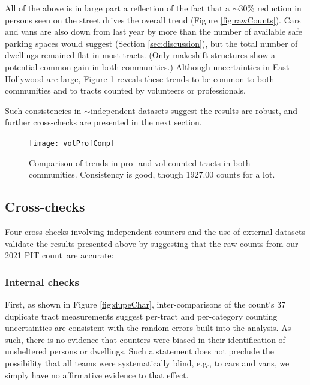\documentclass[11pt,twocolumn]{article}
\def\Count{count}
\begin{document}
All of the above is in large part a reflection of the fact that a $\sim$30\% reduction in persons seen 
on the street drives the overall trend (Figure \ref{fig:rawCounts}). Cars and vans are also down from 
last year by more than the number of available safe parking spaces would suggest 
(Section \ref{sec:discussion}), but the total number of dwellings remained flat in most tracts. 
(Only makeshift structures show a potential common gain in both communities.)
Although uncertainties in East Hollywood are large, Figure \ref{fig:proVolComp} reveals these 
trends to be common to both communities and to tracts counted by volunteers or professionals.

Such consistencies in $\sim$independent datasets suggest the results are robust, and further 
cross-checks are presented in the next section.


\begin{figure}[]
	\centering
	\texttt{[image: volProfComp]}
	\caption{Comparison of trends in pro- and vol-counted tracts in both communities.
			Consistency is good, though 1927.00 counts for a lot.}
	\label{fig:proVolComp}
\end{figure}

\subsection{Cross-checks}
\label{sec:crossChecks}

Four cross-checks involving independent counters and the use of external datasets validate the
results presented above by suggesting that the raw counts from our 2021 PIT \Count\ are accurate:

\subsubsection{Internal checks}

First, as shown in Figure \ref{fig:dupeChar}, inter-comparisons of the count's 37 duplicate tract 
measurements suggest per-tract and per-category counting uncertainties are consistent with the 
random errors built into the analysis. As such, there is no evidence that counters were biased in
their identification of unsheltered persons or dwellings. Such a statement does not preclude the
possibility that all teams were systematically blind, e.g., to cars and vans, we simply have no 
affirmative evidence to that effect.
\end{document}

